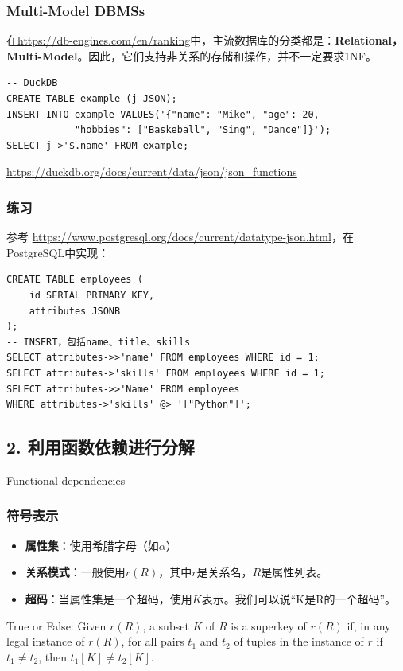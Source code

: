 \documentclass[aspectratio=169, 14pt]{beamer}
\begin{document}
\begin{frame}[fragile]
  \frametitle{Multi-Model DBMSs}
  在\url{https://db-engines.com/en/ranking}中，主流数据库的分类都是：\textbf{Relational，Multi-Model}。因此，它们支持非关系的存储和操作，并不一定要求1NF。

\begin{verbatim}
-- DuckDB 
CREATE TABLE example (j JSON);
INSERT INTO example VALUES('{"name": "Mike", "age": 20, 
            "hobbies": ["Baskeball", "Sing", "Dance"]}');
SELECT j->'$.name' FROM example;
\end{verbatim}

\small{\url{https://duckdb.org/docs/current/data/json/json_functions}}

\end{frame}

\begin{frame}[fragile]
  \frametitle{练习}
  {\small 参考 \url{https://www.postgresql.org/docs/current/datatype-json.html}，在PostgreSQL中实现：}


\begin{verbatim}
CREATE TABLE employees (
    id SERIAL PRIMARY KEY,
    attributes JSONB
);
-- INSERT，包括name、title、skills
SELECT attributes->>'name' FROM employees WHERE id = 1; 
SELECT attributes->'skills' FROM employees WHERE id = 1; 
SELECT attributes->>'Name' FROM employees
WHERE attributes->'skills' @> '["Python"]';
\end{verbatim}
\end{frame}

\begin{frame}
	\section{\textcolor{darkmidnightblue}{2. 利用函数依赖进行分解}}
	Functional dependencies
\end{frame}

\begin{frame}
	\frametitle{符号表示}
	\begin{itemize}
		\item \textbf{属性集}：使用希腊字母（如$\alpha$）
		\item \textbf{关系模式}：一般使用$r(R)$，其中$r$是关系名，$R$是属性列表。
		\item \textbf{超码}：当属性集是一个超码，使用$K$表示。我们可以说“K是R的一个超码”。
	\end{itemize}

	True or False: Given $r(R)$, a subset $K$ of $R$ is a superkey of $r(R)$ if, in any legal instance of $r(R)$, for all pairs $t_1$ and $t_2$ of tuples in the instance of $r$ if $t_1 \neq t_2$, then $t_1[K] \neq t_2[K]$.


\end{frame}
\end{document}

